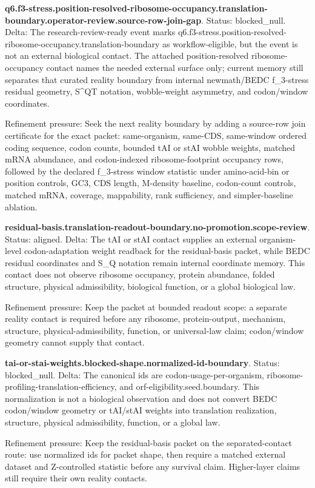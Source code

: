 \textbf{q6.f3-stress.position-resolved-ribosome-occupancy.translation-boundary.operator-review.source-row-join-gap}. Status: blocked\_null. Delta: The research-review-ready event marks q6.f3-stress.position-resolved-ribosome-occupancy.translation-boundary as workflow-eligible, but the event is not an external biological contact. The attached position-resolved ribosome-occupancy contact names the needed external surface only; current memory still separates that curated reality boundary from internal newmath/BEDC f\_3-stress residual geometry, S\textasciicircum{}QT notation, wobble-weight asymmetry, and codon/window coordinates.

Refinement pressure: Seek the next reality boundary by adding a source-row join certificate for the exact packet: same-organism, same-CDS, same-window ordered coding sequence, codon counts, bounded tAI or stAI wobble weights, matched mRNA abundance, and codon-indexed ribosome-footprint occupancy rows, followed by the declared f\_3-stress window statistic under amino-acid-bin or position controls, GC3, CDS length, M-density baseline, codon-count controls, matched mRNA, coverage, mappability, rank sufficiency, and simpler-baseline ablation.

\textbf{residual-basis.translation-readout-boundary.no-promotion.scope-review}. Status: aligned. Delta: The tAI or stAI contact supplies an external organism-level codon-adaptation weight readback for the residual-basis packet, while BEDC residual coordinates and S\_Q notation remain internal coordinate memory. This contact does not observe ribosome occupancy, protein abundance, folded structure, physical admissibility, biological function, or a global biological law.

Refinement pressure: Keep the packet at bounded readout scope: a separate reality contact is required before any ribosome, protein-output, mechanism, structure, physical-admissibility, function, or universal-law claim; codon/window geometry cannot supply that contact.

\textbf{tai-or-stai-weights.blocked-shape.normalized-id-boundary}. Status: blocked\_null. Delta: The canonical ids are codon-usage-per-organism, ribosome-profiling-translation-efficiency, and orf-eligibility.seed.boundary. This normalization is not a biological observation and does not convert BEDC codon/window geometry or tAI/stAI weights into translation realization, structure, physical admissibility, function, or a global law.

Refinement pressure: Keep the residual-basis packet on the separated-contact route: use normalized ids for packet shape, then require a matched external dataset and Z-controlled statistic before any survival claim. Higher-layer claims still require their own reality contacts.

